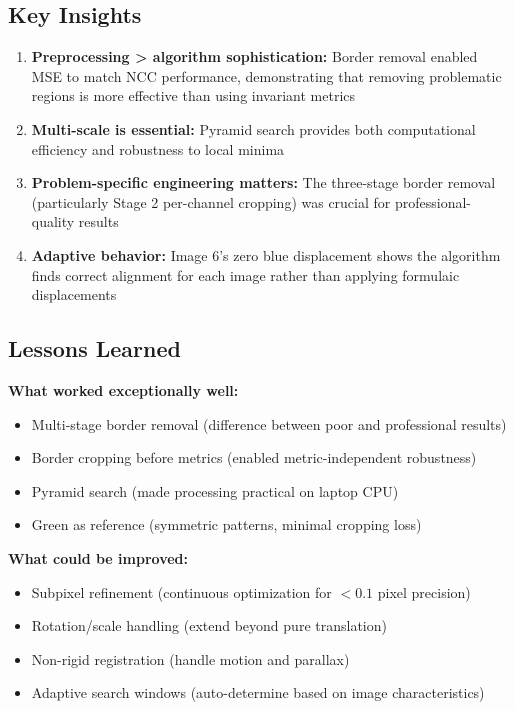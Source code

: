 {\subsection{Key Insights}

\begin{enumerate}
\item \textbf{Preprocessing > algorithm sophistication:} Border removal enabled MSE to match NCC performance, demonstrating that removing problematic regions is more effective than using invariant metrics
\item \textbf{Multi-scale is essential:} Pyramid search provides both computational efficiency and robustness to local minima
\item \textbf{Problem-specific engineering matters:} The three-stage border removal (particularly Stage 2 per-channel cropping) was crucial for professional-quality results
\item \textbf{Adaptive behavior:} Image 6's zero blue displacement shows the algorithm finds correct alignment for each image rather than applying formulaic displacements
\end{enumerate}

\subsection{Lessons Learned}

\textbf{What worked exceptionally well:}
\begin{itemize}
\item Multi-stage border removal (difference between poor and professional results)
\item Border cropping before metrics (enabled metric-independent robustness)
\item Pyramid search (made processing practical on laptop CPU)
\item Green as reference (symmetric patterns, minimal cropping loss)
\end{itemize}

\textbf{What could be improved:}
\begin{itemize}
\item Subpixel refinement (continuous optimization for $<0.1$ pixel precision)
\item Rotation/scale handling (extend beyond pure translation)
\item Non-rigid registration (handle motion and parallax)
\item Adaptive search windows (auto-determine based on image characteristics)
\end{itemize}

}

